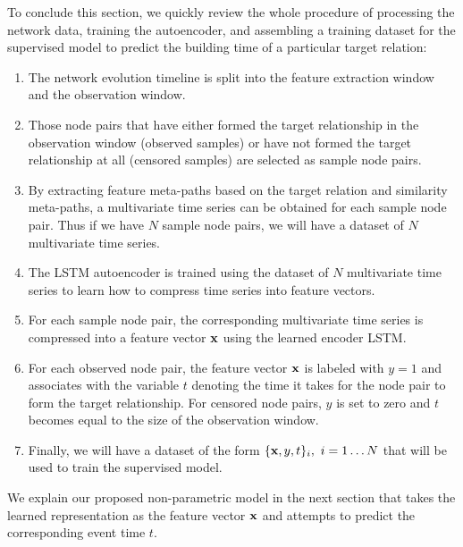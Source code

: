 To conclude this section, we quickly review the whole procedure of processing the network data, training the autoencoder, and assembling a training dataset for the supervised model to predict the building time of a particular target relation:
\begin{enumerate}%
    \item The network evolution timeline is split into the feature extraction window and the observation window.
    \item Those node pairs that have either formed the target relationship in the observation window (observed samples) or have not formed the target relationship at all (censored samples) are selected as sample node pairs.
    \item By extracting feature meta-paths based on the target relation and similarity meta-paths, a multivariate time series can be obtained for each sample node pair. Thus if we have $N$ sample node pairs, we will have a dataset of $N$ multivariate time series.
    \item The LSTM autoencoder is trained using the dataset of $N$ multivariate time series to learn how to compress time series into feature vectors.
    \item For each sample node pair, the corresponding multivariate time series is compressed into a feature vector $\mathbf{x}$ using the learned encoder LSTM. 
    \item For each observed node pair, the feature vector $\mathbf{x}$ is labeled with $y=1$ and associates with the variable $t$ denoting the time it takes for the node pair to form the target relationship. For censored node pairs, $y$ is set to zero and $t$ becomes equal to the size of the observation window.
    \item Finally, we will have a dataset of the form $\{\mathbf{x},y,t\}_i,\ i=1\dots N$ that will be used to train the supervised model.
\end{enumerate}

We explain our proposed non-parametric model in the next section that takes the learned representation as the feature vector $\mathbf{x}$ and attempts to predict the corresponding event time $t$. 


